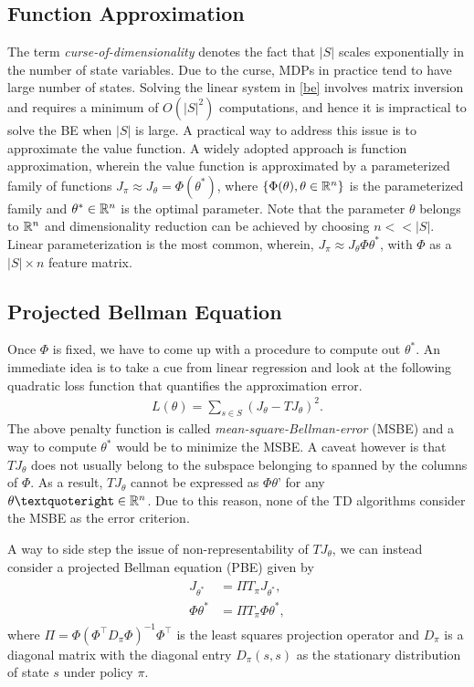 \subsection{Function Approximation}
The term \emph{curse-of-dimensionality} denotes the fact that $|S|$ scales exponentially in the number of state variables. Due to the curse, MDPs in practice tend to have large number of states. Solving the linear system in \eqref{be} involves matrix inversion and requires a minimum of $O(|S|^2)$ computations, and hence it is impractical to solve the BE when $|S|$ is large. A practical way to address this issue is to approximate the value function. A widely adopted approach is function approximation, wherein the value function is approximated by a parameterized family of functions $J_\pi\approx J_\theta= \Phi(\theta^*)$, where $\{\Phi(\theta), \theta\in \mathbb{R}^n\}$ is the parameterized family and $\theta^*\in \mathbb{R}^n$ is the optimal parameter. Note that the parameter $\theta$ belongs to $\mathbb{R}^n$ and dimensionality reduction can be achieved by choosing $n<<|S|$. Linear parameterization is the most common, wherein, $J_\pi\approx J_\theta \Phi\theta^*$, with $\Phi$ as a $|S|\times n$ feature matrix.
\subsection{Projected Bellman Equation}
Once $\Phi$ is fixed, we have to come up with a procedure to compute out $\theta^*$. An immediate idea is to take a cue from linear regression and look at the following quadratic loss function that quantifies the approximation error.
\begin{align}
L(\theta)=\sum_{s\in S}(J_\theta-TJ_\theta)^2.
\end{align}
The above penalty function is called \emph{mean-square-Bellman-error} (MSBE) and a way to compute $\theta^*$ would be to minimize the MSBE. A caveat however is that $TJ_\theta$ does not usually belong to the subspace belonging to spanned by the columns of $\Phi$. As a result, $TJ_\theta$ cannot be expressed as $\Phi \theta’$ for any $\theta’\in \R^n$. Due to this reason, none of the TD algorithms consider the MSBE as the error criterion.\par
A way to side step the issue of non-representability of $TJ_\theta$, we can instead consider a projected Bellman equation (PBE) given by
\begin{align}
\begin{split}
J_{\theta^*}&=\Pi T_\pi J_{\theta^*},\\
\Phi {\theta^*}&=\Pi T_\pi \Phi{\theta^*},
\end{split}
\end{align}
where $\Pi=\Phi(\Phi^\top D_\pi \Phi)^{-1}\Phi^\top$ is the least squares projection operator and $D_\pi$ is a diagonal matrix with the diagonal entry $D_\pi(s,s)$ as the stationary distribution of state $s$ under policy $\pi$.
